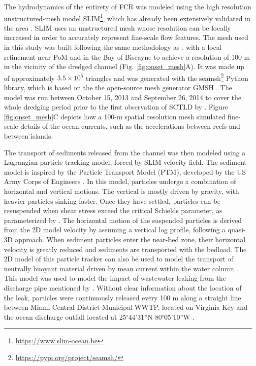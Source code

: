 \documentclass[preprint,12pt,authoryear]{elsarticle}
\begin{document}
The hydrodynamics of the entirety of FCR was modeled using the high resolution unstructured-mesh model SLIM\footnote{\url{ https://www.slim-ocean.be}}, which has already been extensively validated in the area \citep{frys20,dobbelaere2020coupled,dobbelaere2022}. SLIM uses an unstructured mesh whose resolution can be locally increased in order to accurately represent fine-scale flow features. The mesh used in this study was built following the same methodology as \cite{dobbelaere2022}, with a local refinement near PoM and in the Bay of Biscayne to achieve a resolution of 100 m in the vicinity of the dredged channel (Fig. \ref{fig:onset_mesh}A). It was made up of approximately $3.5\times 10^5$ triangles and was generated with the seamsh\footnote{\url{https://pypi.org/project/seamsh/}} Python library, which is based on the the open-source mesh generator GMSH \citep{geuzaine2009gmsh}. The model was run between October 15, 2013 and September 26, 2014 to cover the whole dredging period prior to the first observation of SCTLD by \cite{precht2016unprecedented}. Figure \ref{fig:onset_mesh}C depicts how a 100-m spatial resolution mesh simulated fine-scale details of the ocean currents, such as the accelerations between reefs and between islands.

The transport of sediments released from the channel was then modeled using a Lagrangian particle tracking model, forced by SLIM velocity field. The sediment model is inspired by the Particle Transport Model (PTM), developed by the US Army Corps of Engineers \citep{macdonald2006ptm}. In this model, particles undergo a combination of horizontal and vertical motions. The vertical is mostly driven by gravity, with heavier particles sinking faster. Once they have settled, particles can be resuspended when shear stress exceed the critical Schields parameter, as parameterized by \cite{soulsby1997threshold}. The horizontal motion of the suspended particles is derived from the 2D model velocity by assuming a vertical log profile, following a quasi-3D approach. When sediment particles enter the near-bed zone, their horizontal velocity is greatly reduced and sediments are transported with the bedload. The 2D model of this particle tracker can also be used to model the transport of neutrally buoyant material driven by mean current within the water column \citep{dobbelaere2020coupled}. This model was used to model the impact of wastewater leaking from the discharge pipe mentioned by \cite{gintert2019regional}. Without clear information about the location of the leak, particles were continuously released every 100 m along a straight line between Miami Central District Municipal WWTP, located on Virginia Key and the ocean discharge outfall located at 25$^\circ$44'31''N 80$^\circ$05'10''W \citep{koopman2006ocean}.   
\end{document}
